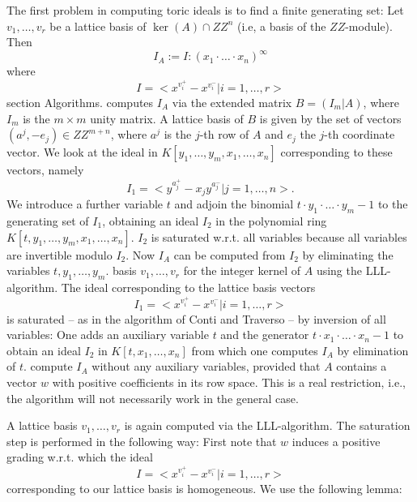 The first problem in computing toric ideals is to find a finite
generating set: Let $v_1,\ldots,v_r$ be a lattice basis of $\ker(A)\cap
Z\!\!\! Z^n$ (i.e, a basis of the $Z\!\!\! Z$-module). Then
$$ I_A:=I:(x_1\cdot\ldots\cdot x_n)^\infty $$
where
$$ I=<x^{v_i^+}-x^{v_i^-}|i=1,\ldots,r> $$
section Algorithms.
computes $I_A$ via the
extended matrix $B=(I_m|A)$,
where $I_m$ is the $m\times m$ unity matrix. A lattice basis of $B$ is
given by the set of vectors $(a^j,-e_j)\in Z\!\!\! Z^{m+n}$, where $a^j$
is the $j$-th row of $A$ and $e_j$ the $j$-th coordinate vector. We
look at the ideal in $K[y_1,\ldots,y_m,x_1,\ldots,x_n]$ corresponding to
these vectors, namely
$$ I_1=<y^{a_j^+}- x_j y^{a_j^-} | j=1,\ldots, n>.$$
We introduce a further variable $t$ and adjoin the binomial $t\cdot
y_1\cdot\ldots\cdot y_m -1$ to the generating set of $I_1$, obtaining
an ideal $I_2$ in the polynomial ring $K[t,
y_1,\ldots,y_m,x_1,\ldots,x_n]$. $I_2$ is saturated w.r.t. all
variables because all variables are invertible modulo $I_2$. Now $I_A$
can be computed from $I_2$ by eliminating the variables
$t,y_1,\ldots,y_m$.
basis $v_1,\ldots,v_r$ for the integer kernel of $A$ using the
LLL-algorithm. The ideal corresponding to the lattice basis vectors
$$ I_1=<x^{v_i^+}-x^{v_i^-}|i=1,\ldots,r> $$
is saturated -- as in the algorithm of Conti and Traverso -- by
inversion of all variables: One adds an auxiliary variable $t$ and the
generator $t\cdot x_1\cdot\ldots\cdot x_n -1$ to obtain an ideal $I_2$
in $K[t,x_1,\ldots,x_n]$ from which one computes $I_A$ by elimination of
$t$.
compute $I_A$ without any auxiliary variables, provided that $A$ contains a vector $w$
with positive coefficients in its row space. This is a real restriction,
i.e., the algorithm will not necessarily work in the general case.

A lattice basis $v_1,\ldots,v_r$ is again computed via the
LLL-algorithm. The saturation step is performed in the following way:
First note that $w$ induces a positive grading w.r.t. which the ideal
$$ I=<x^{v_i^+}-x^{v_i^-}|i=1,\ldots,r> $$
corresponding to our lattice basis is homogeneous. We use the following
lemma:

